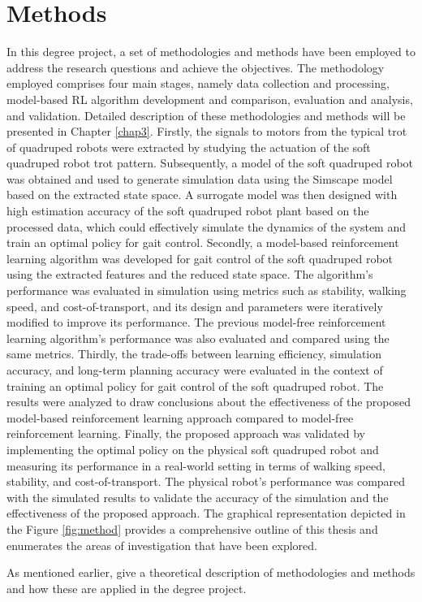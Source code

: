 \section{Methods}
In this degree project, a set of methodologies and methods have been employed to address the research questions and achieve the objectives. The methodology employed comprises four main stages, namely data collection and processing, model-based \ac{RL} algorithm development and comparison, evaluation and analysis, and validation. Detailed description of these methodologies and methods will be presented in Chapter \ref{chap3}. Firstly, the signals to motors from the typical trot of quadruped robots were extracted by studying the actuation of the soft quadruped robot trot pattern. Subsequently, a model of the soft quadruped robot was obtained and used to generate simulation data using the Simscape model based on the extracted state space. A surrogate model was then designed with high estimation accuracy of the soft quadruped robot plant based on the processed data, which could effectively simulate the dynamics of the system and train an optimal policy for gait control. Secondly, a model-based reinforcement learning algorithm was developed for gait control of the soft quadruped robot using the extracted features and the reduced state space. The algorithm's performance was evaluated in simulation using metrics such as stability, walking speed, and cost-of-transport, and its design and parameters were iteratively modified to improve its performance. The previous model-free reinforcement learning algorithm's performance was also evaluated and compared using the same metrics. Thirdly, the trade-offs between learning efficiency, simulation accuracy, and long-term planning accuracy were evaluated in the context of training an optimal policy for gait control of the soft quadruped robot. The results were analyzed to draw conclusions about the effectiveness of the proposed model-based reinforcement learning approach compared to model-free reinforcement learning. Finally, the proposed approach was validated by implementing the optimal policy on the physical soft quadruped robot and measuring its performance in a real-world setting in terms of walking speed, stability, and cost-of-transport. The physical robot's performance was compared with the simulated results to validate the accuracy of the simulation and the effectiveness of the proposed approach. The graphical representation depicted in the Figure \ref{fig:method} provides a comprehensive outline of this thesis and enumerates the areas of investigation that have been explored.


As mentioned earlier, give a theoretical description of methodologies and methods and how these are applied in the degree project.
